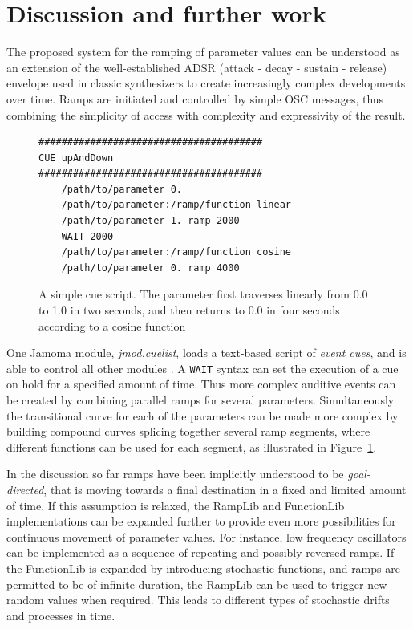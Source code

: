 \documentclass{article}
\begin{document}
\section{Discussion and further work} %
\label{sec:discussion_and_further_work}

The proposed system for the ramping of parameter values can be understood as an extension of the well-established ADSR (attack - decay - sustain - release) envelope used in classic synthesizers to create increasingly complex developments over time. Ramps are initiated and controlled by simple OSC messages, thus combining the simplicity of access with complexity and expressivity of the result.

\begin{figure}
\begin{small}
\begin{verbatim}
#######################################
CUE upAndDown
#######################################
	/path/to/parameter 0.
	/path/to/parameter:/ramp/function linear
	/path/to/parameter 1. ramp 2000
	WAIT 2000
	/path/to/parameter:/ramp/function cosine
	/path/to/parameter 0. ramp 4000
\end{verbatim}
\end{small}
\caption{A simple cue script. The parameter first traverses linearly from 0.0 to 1.0 in two seconds, and then returns to 0.0 in four seconds according to a cosine function}
\label{fig:cuescript}
\end{figure}

One Jamoma module, \emph{jmod.cuelist}, loads a text-based script of \emph{event cues}, and is able to control all other modules \cite{Place:2006}. A \texttt{WAIT} syntax can set the execution of a cue on hold for a specified amount of time. Thus more complex auditive events can be created by combining parallel ramps for several parameters. Simultaneously the transitional curve for each of the parameters can be made more complex by building compound curves splicing together several ramp segments, where different functions can be used for each segment, as illustrated in Figure~\ref{fig:cuescript}.

In the discussion so far ramps have been implicitly understood to be \emph{goal-directed}, that is moving towards a final destination in a fixed and limited amount of time. If this assumption is relaxed, the RampLib and FunctionLib implementations can be expanded further to provide even more possibilities for continuous movement of parameter values. For instance, low frequency oscillators can be implemented as a sequence of repeating and possibly reversed ramps. If the FunctionLib is expanded by introducing stochastic functions, and ramps are permitted to be of infinite duration, the RampLib can be used to trigger new random values when required. This leads to different types of stochastic drifts and processes in time.
\end{document}
